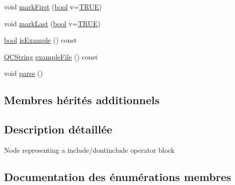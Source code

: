 \begin{DoxyCompactItemize}
\item 
void \hyperlink{class_doc_inc_operator_a7a6913221a98fd408a288ae5af86cda7}{mark\+First} (\hyperlink{qglobal_8h_a1062901a7428fdd9c7f180f5e01ea056}{bool} v=\hyperlink{qglobal_8h_a04a6422a52070f0dc478693da640242b}{T\+R\+U\+E})
\item 
void \hyperlink{class_doc_inc_operator_aec9d5ea066da5f168f5447c67ccc700d}{mark\+Last} (\hyperlink{qglobal_8h_a1062901a7428fdd9c7f180f5e01ea056}{bool} v=\hyperlink{qglobal_8h_a04a6422a52070f0dc478693da640242b}{T\+R\+U\+E})
\item 
\hyperlink{qglobal_8h_a1062901a7428fdd9c7f180f5e01ea056}{bool} \hyperlink{class_doc_inc_operator_a058c0006b89fbfbfc8096470881d73a8}{is\+Example} () const 
\item 
\hyperlink{class_q_c_string}{Q\+C\+String} \hyperlink{class_doc_inc_operator_a648025595293bbc829b9172e7cf2b4eb}{example\+File} () const 
\item 
void \hyperlink{class_doc_inc_operator_a468e20836d11e4cd9e62159e169acc68}{parse} ()
\end{DoxyCompactItemize}
\subsection*{Membres hérités additionnels}


\subsection{Description détaillée}
Node representing a include/dontinclude operator block 

\subsection{Documentation des énumérations membres}
\hypertarget{class_doc_inc_operator_ae7a155da5a206f51e93edc166bd64970}{}
